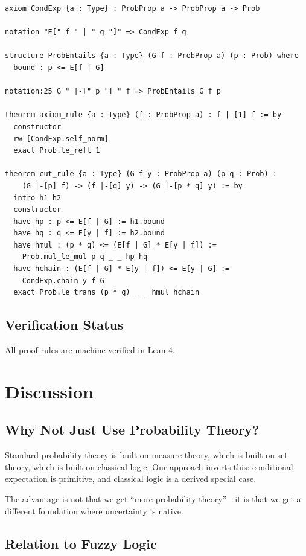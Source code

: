\documentclass[11pt,a4paper]{article}
\begin{document}
\begin{verbatim}
axiom CondExp {a : Type} : ProbProp a -> ProbProp a -> Prob

notation "E[" f " | " g "]" => CondExp f g

structure ProbEntails {a : Type} (G f : ProbProp a) (p : Prob) where
  bound : p <= E[f | G]

notation:25 G " |-[" p "] " f => ProbEntails G f p

theorem axiom_rule {a : Type} (f : ProbProp a) : f |-[1] f := by
  constructor
  rw [CondExp.self_norm]
  exact Prob.le_refl 1

theorem cut_rule {a : Type} (G f y : ProbProp a) (p q : Prob) :
    (G |-[p] f) -> (f |-[q] y) -> (G |-[p * q] y) := by
  intro h1 h2
  constructor
  have hp : p <= E[f | G] := h1.bound
  have hq : q <= E[y | f] := h2.bound
  have hmul : (p * q) <= (E[f | G] * E[y | f]) :=
    Prob.mul_le_mul p q _ _ hp hq
  have hchain : (E[f | G] * E[y | f]) <= E[y | G] :=
    CondExp.chain y f G
  exact Prob.le_trans (p * q) _ _ hmul hchain
\end{verbatim}

\subsection{Verification Status}

All proof rules are machine-verified in Lean 4.

\section{Discussion}

\subsection{Why Not Just Use Probability Theory?}

Standard probability theory is built on measure theory, which is built on set theory, which is built on classical logic. Our approach inverts this: conditional expectation is primitive, and classical logic is a derived special case.

The advantage is not that we get ``more probability theory''---it is that we get a different foundation where uncertainty is native.

\subsection{Relation to Fuzzy Logic}
\end{document}
